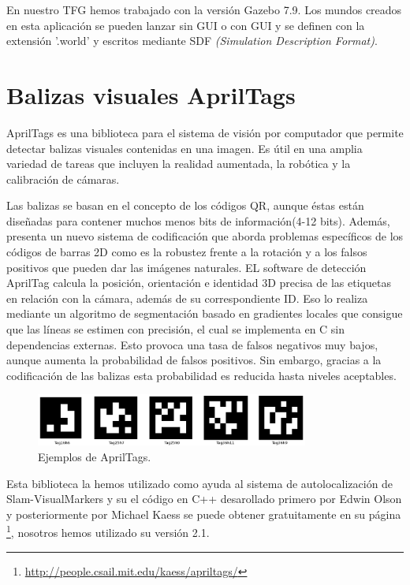 \hspace{1cm} En nuestro TFG hemos trabajado con la versión Gazebo 7.9. Los mundos creados en esta aplicación se pueden lanzar sin GUI o con GUI y se definen con la extensión '.world' y escritos mediante SDF \textit{(Simulation Description Format)}.

\section{Balizas visuales AprilTags}
\hspace{1cm} AprilTags \cite{AprilTags2} es una biblioteca para el sistema de visión por computador que permite detectar balizas visuales contenidas en una imagen. Es útil en una amplia variedad de tareas que incluyen la realidad aumentada, la robótica y la calibración de cámaras.

\hspace{1cm} Las balizas se basan en el concepto de los códigos QR, aunque éstas están diseñadas para contener muchos menos bits de información(4-12 bits). Además, presenta un nuevo sistema de codificación que aborda problemas específicos de los códigos de barras 2D como es la robustez frente a la rotación y a los falsos positivos que pueden dar las imágenes naturales. EL software de detección AprilTag calcula la posición, orientación e identidad 3D precisa de las etiquetas en relación con la cámara, además de su correspondiente ID. Eso lo realiza mediante un algoritmo de segmentación basado en gradientes locales que consigue que las líneas se estimen con precisión, el cual se implementa en C sin dependencias externas. Esto provoca una tasa de falsos negativos muy bajos, aunque aumenta la probabilidad de falsos positivos. Sin embargo, gracias a la codificación de las balizas esta probabilidad es reducida hasta niveles aceptables.
\\

\begin{figure}[H]
	\begin{center}
		\includegraphics[width=0.8\textwidth]{imag/IMG25.png}
				\caption{Ejemplos de AprilTags.} 
	\label{fig:AprilTags.}	
	\end{center}
\end{figure}

\hspace{1cm} Esta biblioteca la hemos utilizado como ayuda al sistema de autolocalización de Slam-VisualMarkers y su el código en C++ desarollado primero por Edwin Olson y posteriormente por Michael Kaess se puede obtener gratuitamente en su página \footnote{\url{http://people.csail.mit.edu/kaess/apriltags/}}, nosotros hemos utilizado su versión 2.1.

